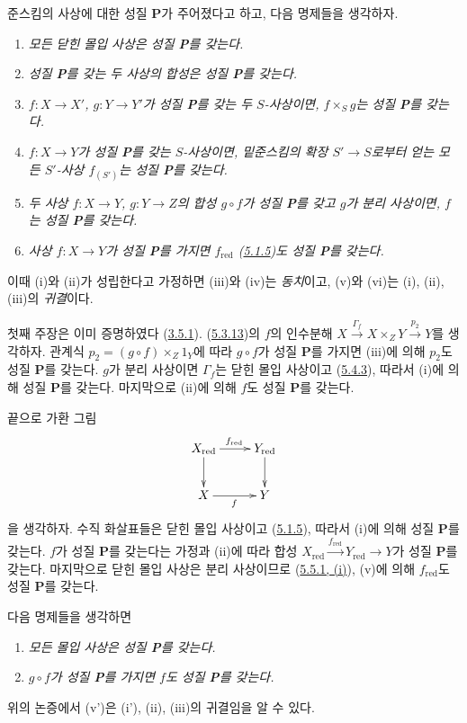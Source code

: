 \begin{remark}[5.5.12]
\label{I.5.5.12-ko}
\normalfont 준스킴의 사상에 대한 성질 \textbf{P}가 주어졌다고 하고,
다음 명제들을 생각하자.
\begin{enumerate}
  \item[\rm(i)] \emph{모든 닫힌 몰입 사상은 성질 \textbf{P}를 갖는다.}
  \item[\rm(ii)] \emph{성질 \textbf{P}를 갖는 두 사상의 합성은 성질
    \textbf{P}를 갖는다.}
  \item[\rm(iii)] \emph{$f:X\to X'$, $g:Y\to Y'$가 성질 \textbf{P}를
    갖는 두 $S$-사상이면, $f\times_S g$는 성질 \textbf{P}를 갖는다.}

  \item[\rm(iv)] \emph{$f:X\to Y$가 성질 \textbf{P}를 갖는
    $S$-사상이면, 밑준스킴의 확장 $S'\to S$로부터 얻는 모든
    $S'$-사상 $f_{(S')}$는 성질 \textbf{P}를 갖는다.}
  \item[\rm(v)] \emph{두 사상 $f:X\to Y$, $g:Y\to Z$의 합성
    $g\circ f$가 성질 \textbf{P}를 갖고 $g$가 분리 사상이면,
    $f$는 성질 \textbf{P}를 갖는다.}
  \item[\rm(vi)] \emph{사상 $f:X\to Y$가 성질 \textbf{P}를 가지면
    $f_{\mathrm{red}}$ (\hyperref[I.5.1.5-ko]{5.1.5})도 성질
    \textbf{P}를 갖는다.}
\end{enumerate}

이때 (i)와 (ii)가 성립한다고 가정하면 (iii)와 (iv)는
\emph{동치}이고, (v)와 (vi)는 (i), (ii), (iii)의
\emph{귀결}이다.

첫째 주장은 이미 증명하였다 (\hyperref[I.3.5.1-ko]{3.5.1}).
(\hyperref[I.5.3.13-ko]{5.3.13})의 $f$의 인수분해
$X\xrightarrow{\Gamma_f}X\times_Z Y\xrightarrow{p_2}Y$를 생각하자.
관계식 $p_2=(g\circ f)\times_Z 1_Y$에 따라 $g\circ f$가 성질
\textbf{P}를 가지면 (iii)에 의해 $p_2$도 성질 \textbf{P}를 갖는다.
$g$가 분리 사상이면 $\Gamma_f$는 닫힌 몰입 사상이고
(\hyperref[I.5.4.3-ko]{5.4.3}), 따라서 (i)에 의해 성질 \textbf{P}를
갖는다. 마지막으로 (ii)에 의해 $f$도 성질 \textbf{P}를 갖는다.

끝으로 가환 그림
\[
  \xymatrix{
    X_{\mathrm{red}}\ar[r]^{f_{\mathrm{red}}}\ar[d] &
    Y_{\mathrm{red}}\ar[d]\\
    X\ar[r]_f &
    Y
  }
\]
을 생각하자. 수직 화살표들은 닫힌 몰입 사상이고
(\hyperref[I.5.1.5-ko]{5.1.5}), 따라서 (i)에 의해 성질
\textbf{P}를 갖는다. $f$가 성질 \textbf{P}를 갖는다는 가정과
(ii)에 따라 합성
$X_{\mathrm{red}}\xrightarrow{f_{\mathrm{red}}}Y_{\mathrm{red}}\to Y$가
성질 \textbf{P}를 갖는다. 마지막으로 닫힌 몰입 사상은 분리
사상이므로 (\hyperref[I.5.5.1-ko]{5.5.1, (i)}), (v)에 의해
$f_{\mathrm{red}}$도 성질 \textbf{P}를 갖는다.

다음 명제들을 생각하면
\begin{enumerate}
  \item[\rm(i')] \emph{모든 몰입 사상은 성질 \textbf{P}를 갖는다.}
  \item[\rm(v')] \emph{$g\circ f$가 성질 \textbf{P}를 가지면 $f$도
    성질 \textbf{P}를 갖는다.}
\end{enumerate}
위의 논증에서 (v')은 (i'), (ii), (iii)의 귀결임을 알 수 있다.
\end{remark}

